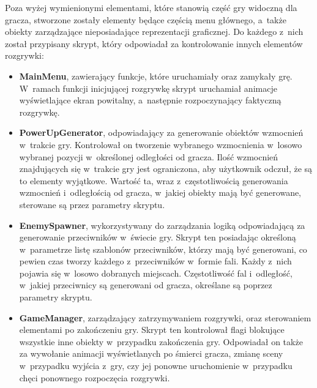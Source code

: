 Poza wyżej wymienionymi elementami, które stanowią część gry widoczną dla gracza, stworzone zostały elementy będące częścią menu głównego, a~także obiekty zarządzające nieposiadające reprezentacji graficznej. Do każdego z~nich został przypisany skrypt, który odpowiadał za kontrolowanie innych elementów rozgrywki:
\begin{itemize}
	\item \textbf{MainMenu}, zawierający funkcje, które uruchamiały oraz zamykały grę. W~ramach funkcji inicjującej rozgrywkę skrypt uruchamiał animacje wyświetlające ekran powitalny, a~następnie rozpoczynający faktyczną rozgrywkę.
	\item \textbf{PowerUpGenerator}, odpowiadający za generowanie obiektów wzmocnień w~trakcie gry. Kontrolował on tworzenie wybranego wzmocnienia w~losowo wybranej pozycji w~określonej odległości od gracza. Ilość wzmocnień znajdujących się  w~trakcie gry jest ograniczona, aby użytkownik odczuł, że są to elementy wyjątkowe. Wartość ta, wraz z~częstotliwością generowania wzmocnień i~odległością od gracza, w~jakiej obiekty mają być generowane, sterowane są przez parametry skryptu. 
	\item \textbf{EnemySpawner}, wykorzystywany do zarządzania logiką odpowiadającą za generowanie przeciwników w~świecie gry. Skrypt ten posiadając określoną w~parametrze listę szablonów przeciwników, którzy mają być generowani, co pewien czas tworzy każdego z~przeciwników w~formie fali. Każdy z~nich pojawia się w~losowo dobranych miejscach. Częstotliwość fal i~odległość, w~jakiej przeciwnicy są generowani od gracza, określane są poprzez parametry skryptu.
	\item \textbf{GameManager}, zarządzający zatrzymywaniem rozgrywki, oraz sterowaniem elementami po zakończeniu gry. Skrypt ten kontrolował flagi blokujące wszystkie inne obiekty w~przypadku zakończenia gry. Odpowiadał on także za wywołanie animacji wyświetlanych po śmierci gracza, zmianę sceny w~przypadku wyjścia z~gry, czy jej ponowne uruchomienie w~przypadku chęci ponownego rozpoczęcia rozgrywki.

\end{itemize}
